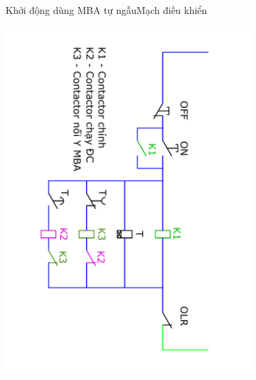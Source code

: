 \documentclass[17pt]{beamer}
\begin{document}
\begin{frame}{Khởi động dùng MBA tự ngẫu}{Mạch điều khiển}
\vspace{-1.5cm}
\begin{center}
\includegraphics[width = 0.7\textwidth,angle=90]{../sodomach/sodomach-bc-chude1-34.pdf}
\end{center}
\end{frame}
\end{document}
